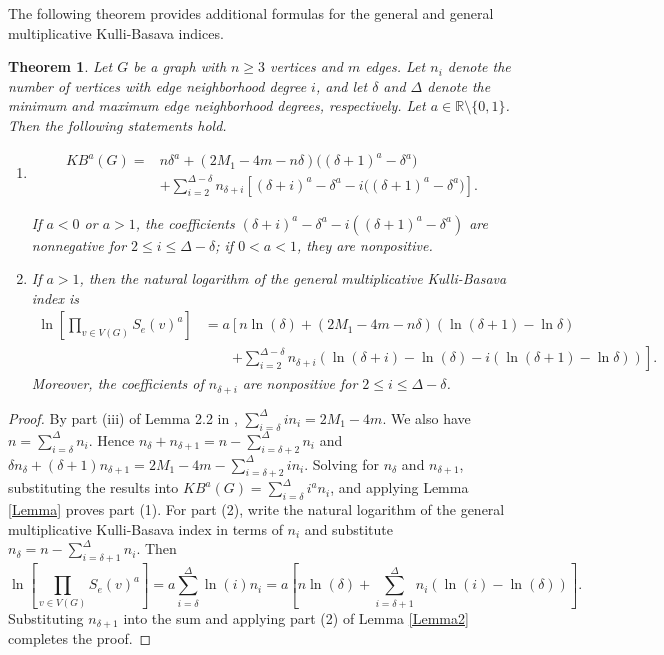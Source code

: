 \documentclass[11pt, oneside]{amsart}   	%
\newtheorem{theorem}{Theorem}[section]
\theoremstyle{definition}
\theoremstyle{remark}
\numberwithin{equation}{section}
\begin{document}
The following theorem provides additional formulas for the general and general multiplicative Kulli-Basava indices.


\begin{theorem}\label{Theorem2}
Let $G$ be a graph with $n\geq 3$ vertices and $m$ edges. Let $n_i$ denote the number of vertices with edge neighborhood degree $i$, and let $\delta$ and $\Delta$ denote the minimum and maximum edge neighborhood degrees, respectively. Let $a\in\mathbb{R}\setminus\{0,1\}$. Then the following statements hold.
 \begin{enumerate}
 \item
\begin{align*}
KB^a(G)={}&n\delta^a+(2M_1-4m-n\delta)\bigl((\delta+1)^a-\delta^a\bigr)\\
&+\sum_{i=2}^{\Delta-\delta}n_{\delta+i}
\left[(\delta+i)^a-\delta^a-i\bigl((\delta+1)^a-\delta^a\bigr)\right].
\end{align*}
   
If $a<0$ or $a>1$, the coefficients $(\delta+i)^a-\delta^a-i((\delta+1)^a-\delta^a)$ are nonnegative for $2\leq i\leq\Delta-\delta$; if $0<a<1$, they are nonpositive.

\item If $a>1$, then the natural logarithm of the general multiplicative Kulli-Basava index is
\[
\begin{aligned}
\ln\left[\prod_{v\in V(G)}S_e(v)^a\right]
&=a\left[n\ln(\delta)+(2M_1-4m-n\delta)(\ln(\delta+1)-\ln\delta)\right.\\
&\qquad\left.+\sum_{i=2}^{\Delta-\delta}n_{\delta+i}\left(\ln(\delta+i)-\ln(\delta)-i(\ln(\delta+1)-\ln\delta)\right)\right].
\end{aligned}
\]
Moreover, the coefficients of $n_{\delta+i}$ are nonpositive for $2\leq i\leq\Delta-\delta$.
\end{enumerate} 
 
\end{theorem}

\begin{proof}

By part (iii) of Lemma 2.2 in \cite{basavanagoud2019kulli}, $\sum_{i=\delta}^\Delta i n_i=2M_1-4m$. We also have $n=\sum_{i=\delta}^\Delta n_i$. Hence $n_\delta+n_{\delta+1}=n-\sum_{i=\delta+2}^\Delta n_i$ and $\delta n_\delta+(\delta+1)n_{\delta+1}=2M_1-4m-\sum_{i=\delta+2}^\Delta i n_i$. Solving for $n_\delta$ and $n_{\delta+1}$, substituting the results into $KB^a(G)=\sum_{i=\delta}^\Delta i^a n_i$, and applying Lemma \ref{Lemma} proves part (1). For part (2), write the natural logarithm of the general multiplicative Kulli-Basava index in terms of $n_i$ and substitute $n_\delta=n-\sum_{i=\delta+1}^\Delta n_i$. Then
\[
\ln\left[\prod_{v\in V(G)}S_e(v)^a\right]=a\sum_{i=\delta}^\Delta\ln(i)n_i=a\left[n\ln(\delta)+\sum_{i=\delta+1}^\Delta n_i(\ln(i)-\ln(\delta))\right].
\]
Substituting $n_{\delta+1}$ into the sum and applying part (2) of Lemma \ref{Lemma2} completes the proof.

\end{proof}
\end{document}
